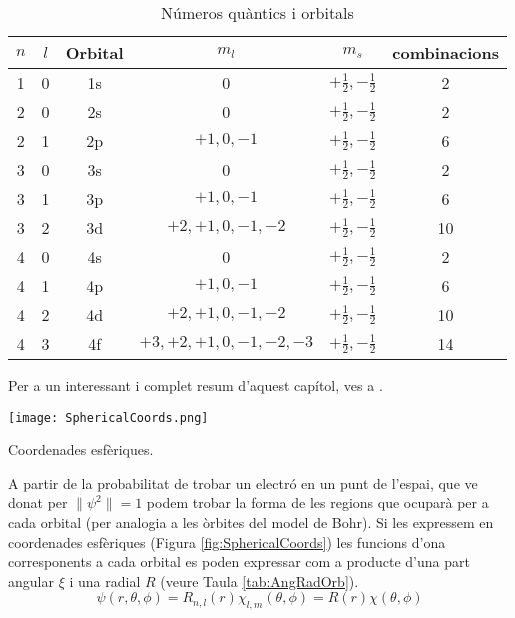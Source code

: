 \begin{table}
  \begin{center}
    \caption{Números quàntics i orbitals \citep{mahan_quimica_1997}}
    \label{tab:quant}
    \begin{tabular}{cccccc}
      \hline
      $n$ & $l$ & Orbital & $m_l$ & $m_s$ & combinacions\\
      \hline
      1 & 0 & 1s & 0 & $+\frac{1}{2},-\frac{1}{2}$ & 2 \\
      2 & 0 & 2s & 0 & $+\frac{1}{2},-\frac{1}{2}$ & 2 \\
      2 & 1 & 2p & $+1,0,-1$ & $+\frac{1}{2},-\frac{1}{2}$ & 6 \\
      3 & 0 & 3s & 0 & $+\frac{1}{2},-\frac{1}{2}$ & 2 \\
      3 & 1 & 3p & $+1,0,-1$ & $+\frac{1}{2},-\frac{1}{2}$ & 6 \\
      3 & 2 & 3d & $+2,+1,0,-1,-2$ & $+\frac{1}{2},-\frac{1}{2}$ & 10 \\
      4 & 0 & 4s & 0 & $+\frac{1}{2},-\frac{1}{2}$ & 2 \\
      4 & 1 & 4p & $+1,0,-1$ & $+\frac{1}{2},-\frac{1}{2}$ & 6 \\
      4 & 2 & 4d & $+2,+1,0,-1,-2$ & $+\frac{1}{2},-\frac{1}{2}$ & 10 \\
      4 & 3 & 4f & $+3,+2,+1,0,-1,-2,-3$ & $+\frac{1}{2},-\frac{1}{2}$ & 14 \\
      \hline
    \end{tabular}
  \end{center}
\end{table}

Per a un interessant i complet resum d'aquest capítol, ves a \citep{averill_principles_2012}.

\begin{marginfigure}
\centering
\texttt{[image: SphericalCoords.png]}
\caption{Coordenades esfèriques.}
\label{fig:SphericalCoords}
\end{marginfigure}

A partir de la probabilitat de trobar un electró en un punt de l'espai, que ve donat per $\|\psi^2\|=1$ podem trobar la forma de les regions que ocuparà per a cada orbital (per analogia a les òrbites del model de Bohr). Si les expressem en coordenades esfèriques (Figura \ref{fig:SphericalCoords}) les funcions d'ona corresponents a cada orbital es poden expressar com a producte d'una part angular $\xi$ i una radial $R$ (veure Taula \ref{tab:AngRadOrb}).
\begin{equation}
\psi(r,\theta,\phi)=R_{n,l}(r)\chi_{l,m}(\theta,\phi)=R(r)\chi(\theta,\phi)
\label{Eq:psisplit}
\end{equation}

